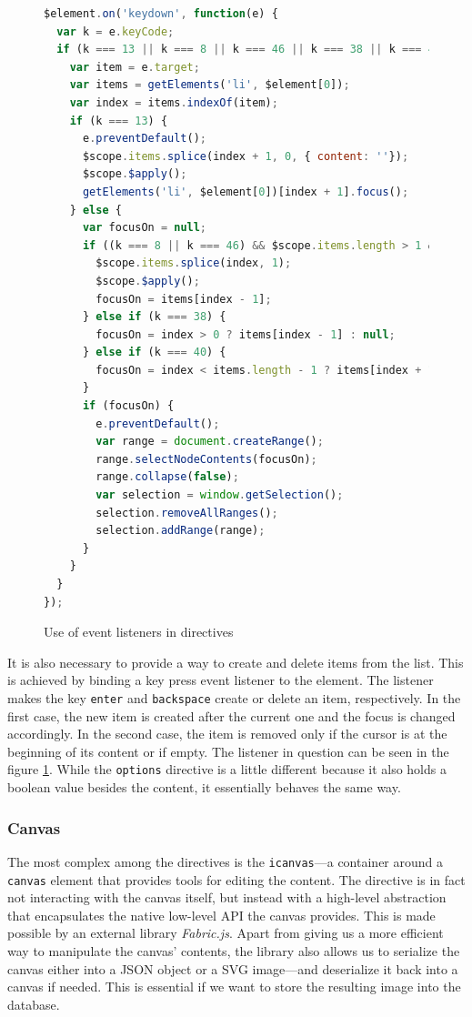\documentclass[thesis=M,english,hidelinks]{FITthesis}[2012/10/20]
\newcommand{\code}{\texttt}
\begin{document}
\begin{figure}
  \begin{lstlisting}[language=JavaScript]
$element.on('keydown', function(e) {
  var k = e.keyCode;
  if (k === 13 || k === 8 || k === 46 || k === 38 || k === 40) {
    var item = e.target;
    var items = getElements('li', $element[0]);
    var index = items.indexOf(item);
    if (k === 13) {
      e.preventDefault();
      $scope.items.splice(index + 1, 0, { content: ''});
      $scope.$apply();
      getElements('li', $element[0])[index + 1].focus();
    } else {
      var focusOn = null;
      if ((k === 8 || k === 46) && $scope.items.length > 1 && !$scope.items[index].content) {
        $scope.items.splice(index, 1);
        $scope.$apply();
        focusOn = items[index - 1];
      } else if (k === 38) {
        focusOn = index > 0 ? items[index - 1] : null;
      } else if (k === 40) {
        focusOn = index < items.length - 1 ? items[index + 1] : null;
      }
      if (focusOn) {
        e.preventDefault();
        var range = document.createRange();
        range.selectNodeContents(focusOn);
        range.collapse(false);
        var selection = window.getSelection();
        selection.removeAllRanges();
        selection.addRange(range);
      }
    }
  }
});
  \end{lstlisting}
  \caption{Use of event listeners in directives}
  \label{fig:list_directive}
\end{figure}

It is also necessary to provide a way to create and delete items from the list. This is achieved by binding a key press event listener to the element. The listener makes the key \code{enter} and \code{backspace} create or delete an item, respectively. In the first case, the new item is created after the current one and the focus is changed accordingly. In the second case, the item is removed only if the cursor is at the beginning of its content or if empty. The listener in question can be seen in the figure \ref{fig:list_directive}. While the \code{options} directive is a little different because it also holds a boolean value besides the content, it essentially behaves the same way.

      \subsubsection{Canvas}

The most complex among the directives is the \code{icanvas}---a container around a \code{canvas} element that provides tools for editing the content. The directive is in fact not interacting with the canvas itself, but instead with a high-level abstraction that encapsulates the native low-level API the canvas provides. This is made possible by an external library \textit{Fabric.js}. Apart from giving us a more efficient way to manipulate the canvas' contents, the library also allows us to serialize the canvas either into a JSON object or a SVG image---and deserialize it back into a canvas if needed. This is essential if we want to store the resulting image into the database.
\end{document}
